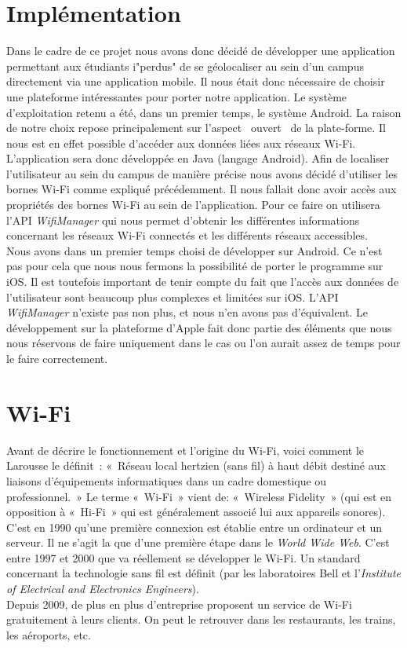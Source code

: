 \documentclass[11pt,a4paper]{article}
\begin{document}
\newpage
\section{Implémentation}
Dans le cadre de ce projet nous avons donc décidé de développer une application permettant aux étudiants i"perdus" de se géolocaliser au sein d'un campus directement via une application mobile. Il nous était donc nécessaire de choisir une plateforme intéressantes pour porter notre application. Le système d'exploitation retenu a été, dans un premier temps, le système Android. La raison de notre choix repose principalement sur l'aspect \og~ouvert~\fg{} de la plate-forme. Il nous est en effet possible d'accéder aux données liées aux réseaux Wi-Fi.\\
L'application sera donc développée en Java (langage Android). Afin de localiser l'utilisateur au sein du campus de manière précise nous avons décidé d'utiliser les bornes Wi-Fi comme expliqué précédemment. Il nous fallait donc avoir accès aux propriétés des bornes Wi-Fi au sein de l'application. Pour ce faire on utilisera l'API \textit{WifiManager} qui nous permet d'obtenir les différentes informations concernant les réseaux Wi-Fi connectés et les différents réseaux accessibles.\\
Nous avons dans un premier temps choisi de développer sur Android. Ce n'est pas pour cela que nous nous fermons la possibilité de porter le programme sur iOS. Il est toutefois important de tenir compte du fait que l'accès aux données de l'utilisateur sont beaucoup plus complexes et limitées sur iOS. L'API \textit{WifiManager} n'existe pas non plus, et nous n'en avons pas d'équivalent. Le développement sur la plateforme d'Apple fait donc partie des éléments que nous nous réservons de faire uniquement dans le cas ou l'on aurait assez de temps pour le faire correctement.

\section{Wi-Fi}
  Avant de décrire le fonctionnement et l'origine du Wi-Fi, voici comment le Larousse le définit~: «~Réseau local hertzien (sans fil) à haut débit destiné aux liaisons d'équipements informatiques dans un cadre domestique ou professionnel.~»
  Le terme «~Wi-Fi~» vient de: «~Wireless Fidelity~» (qui est en opposition à «~Hi-Fi~» qui est généralement associé lui aux appareils sonores).\\
  C'est en 1990 qu'une première connexion est établie entre un ordinateur et un serveur.  Il ne s'agit la que d'une première étape dans le \textit{World Wide Web}. C'est entre 1997 et 2000 que va réellement se développer le Wi-Fi. Un standard concernant la technologie sans fil est définit (par les laboratoires Bell et l'\textit{Institute of Electrical and Electronics Engineers}).\\
  Depuis 2009, de plus en plus d'entreprise proposent un service de Wi-Fi gratuitement à leurs clients.  On peut le retrouver dans les restaurants, les trains, les aéroports, etc.
\end{document}
